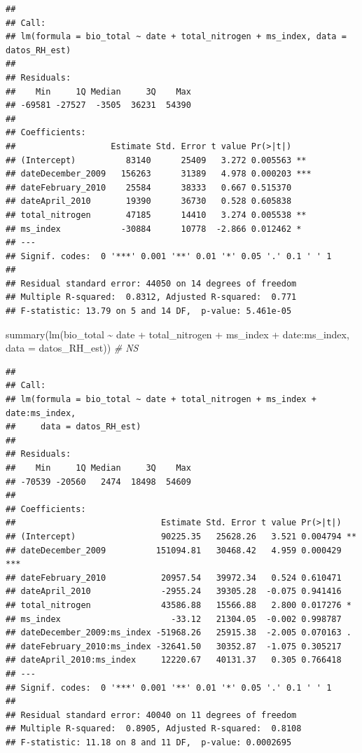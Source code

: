 \documentclass[
]{book}
\newenvironment{Shaded}{\begin{snugshade}}{\end{snugshade}}
\newcommand{\AttributeTok}[1]{\textcolor[rgb]{0.77,0.63,0.00}{#1}}
\newcommand{\CommentTok}[1]{\textcolor[rgb]{0.56,0.35,0.01}{\textit{#1}}}
\newcommand{\FunctionTok}[1]{\textcolor[rgb]{0.00,0.00,0.00}{#1}}
\newcommand{\NormalTok}[1]{#1}
\newcommand{\SpecialCharTok}[1]{\textcolor[rgb]{0.00,0.00,0.00}{#1}}
\begin{document}
\begin{verbatim}
## 
## Call:
## lm(formula = bio_total ~ date + total_nitrogen + ms_index, data = datos_RH_est)
## 
## Residuals:
##    Min     1Q Median     3Q    Max 
## -69581 -27527  -3505  36231  54390 
## 
## Coefficients:
##                   Estimate Std. Error t value Pr(>|t|)    
## (Intercept)          83140      25409   3.272 0.005563 ** 
## dateDecember_2009   156263      31389   4.978 0.000203 ***
## dateFebruary_2010    25584      38333   0.667 0.515370    
## dateApril_2010       19390      36730   0.528 0.605838    
## total_nitrogen       47185      14410   3.274 0.005538 ** 
## ms_index            -30884      10778  -2.866 0.012462 *  
## ---
## Signif. codes:  0 '***' 0.001 '**' 0.01 '*' 0.05 '.' 0.1 ' ' 1
## 
## Residual standard error: 44050 on 14 degrees of freedom
## Multiple R-squared:  0.8312, Adjusted R-squared:  0.771 
## F-statistic: 13.79 on 5 and 14 DF,  p-value: 5.461e-05
\end{verbatim}

\begin{Shaded}
\begin{Highlighting}[]
\FunctionTok{summary}\NormalTok{(}\FunctionTok{lm}\NormalTok{(bio\_total }\SpecialCharTok{\textasciitilde{}}\NormalTok{ date }\SpecialCharTok{+}\NormalTok{ total\_nitrogen }\SpecialCharTok{+}\NormalTok{ ms\_index }\SpecialCharTok{+}\NormalTok{ date}\SpecialCharTok{:}\NormalTok{ms\_index, }\AttributeTok{data =}\NormalTok{ datos\_RH\_est)) }\CommentTok{\# NS}
\end{Highlighting}
\end{Shaded}

\begin{verbatim}
## 
## Call:
## lm(formula = bio_total ~ date + total_nitrogen + ms_index + date:ms_index, 
##     data = datos_RH_est)
## 
## Residuals:
##    Min     1Q Median     3Q    Max 
## -70539 -20560   2474  18498  54609 
## 
## Coefficients:
##                             Estimate Std. Error t value Pr(>|t|)    
## (Intercept)                 90225.35   25628.26   3.521 0.004794 ** 
## dateDecember_2009          151094.81   30468.42   4.959 0.000429 ***
## dateFebruary_2010           20957.54   39972.34   0.524 0.610471    
## dateApril_2010              -2955.24   39305.28  -0.075 0.941416    
## total_nitrogen              43586.88   15566.88   2.800 0.017276 *  
## ms_index                      -33.12   21304.05  -0.002 0.998787    
## dateDecember_2009:ms_index -51968.26   25915.38  -2.005 0.070163 .  
## dateFebruary_2010:ms_index -32641.50   30352.87  -1.075 0.305217    
## dateApril_2010:ms_index     12220.67   40131.37   0.305 0.766418    
## ---
## Signif. codes:  0 '***' 0.001 '**' 0.01 '*' 0.05 '.' 0.1 ' ' 1
## 
## Residual standard error: 40040 on 11 degrees of freedom
## Multiple R-squared:  0.8905, Adjusted R-squared:  0.8108 
## F-statistic: 11.18 on 8 and 11 DF,  p-value: 0.0002695
\end{verbatim}
\end{document}
